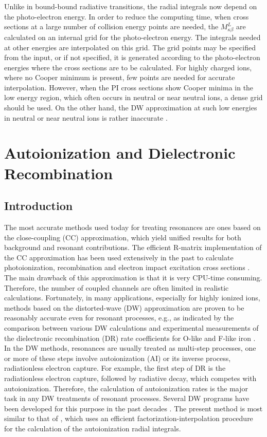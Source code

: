 Unlike in bound-bound radiative transitions, the radial integrals now
depend on the photo-electron energy. In order to reduce the computing time,
when cross sections at a large number of collision energy points are needed,
the $M^L_{\kappa\beta}$ are calculated on an internal grid for the
photo-electron energy. The integrals needed at other energies are interpolated
on this grid. The grid points may be specified from the input, or if not
specified, it is generated according to the photo-electron energies where the
cross sections are to be calculated. For highly charged ions, where no Cooper
minimum is present, few points are needed for accurate interpolation. However,
when the PI cross sections show Cooper minima in the low energy region, which
often occurs in neutral or near neutral ions, a dense grid
should be used. On the other hand, the DW approximation at such low energies
in neutral or near neutral ions is rather inaccurate \cite{zhang:1998a}.


\section{Autoionization and Dielectronic Recombination}
\subsection{Introduction}
The most accurate methods used today for treating resonances are ones based on
the close-coupling (CC) approximation, which yield unified results for both
background and resonant contributions. The efficient R-matrix implementation of
the CC approximation has been used extensively in the past to calculate
photoionization, recombination and electron impact excitation cross sections
\cite{hummer:1993a, berrington:1995a}. The main drawback of this approximation
is that it is very CPU-time consuming. Therefore, the number of coupled channels
are often limited in realistic calculations. Fortunately, in many applications,
especially for highly  ionized ions, methods based on the distorted-wave (DW)
approximation are proven to be reasonably accurate even for resonant processes,
e.g., as indicated by the comparison between various DW calculations and
experimental  measurements of the dielectronic recombination (DR) rate
coefficients for O-like and F-like iron \cite{savin:1999a}. In the DW methods,
resonances are usually treated as  multi-step processes, one or more of these
steps involve autoionization (AI) or its inverse process, radiationless electron
capture. For example, the first step of DR is the radiationless electron
capture, followed by radiative decay, which competes with autoionization.
Therefore, the calculation of autoionization rates is the major task in any DW
treatments of resonant processes. Several DW programs have been developed for
this purpose in the past decades \cite{pindzola:1980a, kim:1987a, oreg:1991a}.
The present method is most similar to that of \citet{oreg:1991a}, which uses an
efficient factorization-interpolation procedure for the calculation of the
autoionization radial integrals. 

